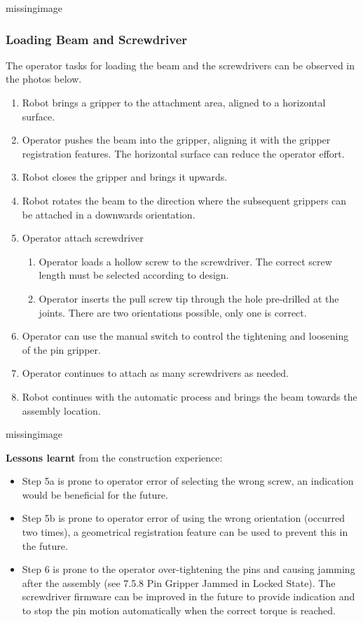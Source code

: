 missingimage

\subsubsection{Loading Beam and Screwdriver}
The operator tasks for loading the beam and the screwdrivers can be observed in the photos below. 
\begin{enumerate}
    \item Robot brings a gripper to the attachment area, aligned to a horizontal surface.
    \item Operator pushes the beam into the gripper, aligning it with the gripper registration features. The horizontal surface can reduce the operator effort.
    \item Robot closes the gripper and brings it upwards.
    \item Robot rotates the beam to the direction where the subsequent grippers can be attached in a downwards orientation.
    \item Operator attach screwdriver
    \begin{enumerate}
        \item Operator loads a hollow screw to the screwdriver. The correct screw length must be selected according to design.
        \item Operator inserts the pull screw tip through the hole pre-drilled at the joints. There are two orientations possible, only one is correct.
    \end{enumerate}
    \item Operator can use the manual switch to control the tightening and loosening of the pin gripper.
    \item Operator continues to attach as many screwdrivers as needed.
    \item Robot continues with the automatic process and brings the beam towards the assembly location.
\end{enumerate}

missingimage

\textbf{Lessons learnt }from the construction experience:
\begin{itemize}
    \item Step 5a is prone to operator error of selecting the wrong screw, an indication would be beneficial for the future.
    \item Step 5b is prone to operator error of using the wrong orientation (occurred two times), a geometrical registration feature can be used to prevent this in the future.
    \item Step 6 is prone to the operator over-tightening the pins and causing jamming after the assembly (see 7.5.8 Pin Gripper Jammed in Locked State). The screwdriver firmware can be improved in the future to provide indication and to stop the pin motion automatically when the correct torque is reached.
\end{itemize}

